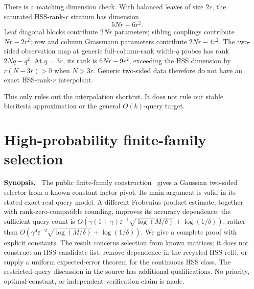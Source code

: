 \documentclass[11pt,oneside,openany,a4paper]{book}
\numberwithin{equation}{chapter}
\theoremstyle{definition}
\theoremstyle{remark}
\newenvironment{chaptersynopsis}{\begingroup\small\textbf{Synopsis.}\ }{\par\endgroup\medskip}
\newcommand{\R}{\mathbb R}\newcommand{\E}{\mathbb E}\newcommand{\Prb}{\mathbb P}\newcommand{\PP}{\mathbb P}
\newcommand{\T}{\mathsf T}\newcommand{\Id}{I}
\newcommand{\F}[1]{\left\lVert#1\right\rVert_F}
\newcommand{\op}[1]{\left\lVert#1\right\rVert_{\rm op}}
\DeclareMathOperator{\tr}{tr}\DeclareMathOperator{\rank}{rank}
\DeclareMathOperator{\orth}{orth}\DeclareMathOperator*{\argmin}{arg\,min}
\begin{document}
There is a matching dimension check. With balanced leaves of size $2r$, the saturated HSS-rank-$r$ stratum has dimension
\[
 5Nr-6r^2.
\]
Leaf diagonal blocks contribute $2Nr$ parameters; sibling couplings contribute $Nr-2r^2$; row and column Grassmann parameters contribute $2Nr-4r^2$. The two-sided observation map at generic full-column-rank width-$q$ probes has rank $2Nq-q^2$. At $q=3r$, its rank is $6Nr-9r^2$, exceeding the HSS dimension by $r(N-3r)>0$ when $N>3r$. Generic two-sided data therefore do not have an exact HSS-rank-$r$ interpolant.

This only rules out the interpolation shortcut. It does not rule out stable bicriteria approximation or the general $O(k)$-query target.

\endgroup

\begingroup
\let\E\relax
\newcommand{\E}{\mathbb E}
\let\R\relax
\newcommand{\R}{\mathbb R}
\let\T\relax
\newcommand{\T}{\mathsf T}
\let\F\relax
\newcommand{\F}[1]{\lVert#1\rVert_F}
\let\op\relax
\newcommand{\op}[1]{\lVert#1\rVert_2}
\let\tr\relax
\newcommand{\tr}{\operatorname{tr}}
\let\rank\relax
\newcommand{\rank}{\operatorname{rank}}
\let\orth\relax
\newcommand{\orth}{\operatorname{orth}}
\let\argmin\relax
\newcommand{\argmin}{\operatorname*{arg\,min}}
\chapter{High-probability finite-family selection}\label{ch:finite}
\begin{chaptersynopsis}
The public finite-family construction~\cite{Note} gives a Gaussian two-sided selector from a known constant-factor pivot. Its main argument is valid in its stated exact-real query model. A different Frobenius-product estimate, together with rank-zero-compatible rounding, improves its accuracy dependence: the sufficient query count is
$O(\gamma(1+\gamma)\varepsilon^{-1}\sqrt{\log(M/\delta)}+\log(1/\delta))$, rather than $O(\gamma^4\varepsilon^{-2}\sqrt{\log(M/\delta)}+\log(1/\delta))$.
We give a complete proof with explicit constants. The result concerns selection from known matrices; it does not construct an HSS candidate list, remove dependence in the recycled HSS refit, or supply a uniform expected-error theorem for the continuous HSS class. The restricted-query discussion in the source has additional qualifications. No priority, optimal-constant, or independent-verification claim is made.
\end{chaptersynopsis}
\end{document}
